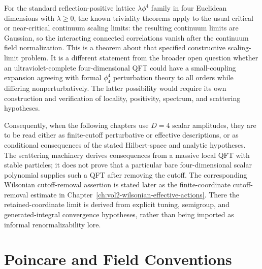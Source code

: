 \begin{remark}
\label{rem:four-dimensional-scalar-amplitude-status}
For the standard reflection-positive lattice \(\lambda\phi^4\) family in four
Euclidean dimensions with \(\lambda\ge0\), the known triviality theorems apply
to the usual critical or near-critical continuum scaling limits: the resulting
continuum limits are Gaussian, so the interacting connected correlations
vanish after the continuum field normalization.  This is a theorem about that
specified constructive scaling-limit problem.  It is a different statement from
the broader open question whether an ultraviolet-complete four-dimensional QFT
could have a small-coupling expansion agreeing with formal
\(\phi^4_4\) perturbation theory to all orders while differing
nonperturbatively.  The latter possibility would require its own construction
and verification of locality, positivity, spectrum, and scattering hypotheses.

Consequently, when the following chapters use \(D=4\) scalar amplitudes, they
are to be read either as finite-cutoff perturbative or effective descriptions,
or as conditional consequences of the stated Hilbert-space and analytic
hypotheses.  The scattering machinery derives consequences from a massive
local QFT with stable particles; it does not prove that a particular bare
four-dimensional scalar polynomial supplies such a QFT after removing the
cutoff.
The corresponding Wilsonian cutoff-removal assertion is stated later as the
finite-coordinate cutoff-removal estimate in
Chapter~\ref{ch:vol2-wilsonian-effective-actions}.  There the
retained-coordinate limit is derived from explicit tuning, semigroup, and
generated-integral convergence hypotheses, rather than being imported as
informal renormalizability lore.
\end{remark}

\section{Poincare and Field Conventions}

